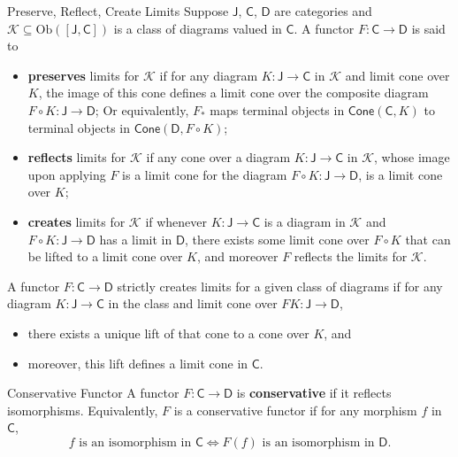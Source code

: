 \begin{definition}{Preserve, Reflect, Create Limits}{}
    Suppose $\mathsf{J}$, $\mathsf{C}$, $\mathsf{D}$ are categories and $\mathcal{K}\subseteq\mathrm{Ob}\left([\mathsf{J}, \mathsf{C}]\right)$ is a class of diagrams  valued in $\mathsf{C}$. A functor $F: \mathsf{C} \rightarrow \mathsf{D}$ is said to
    \begin{itemize}
        \item \textbf{preserves} limits for $\mathcal{K}$ if for any diagram $K: \mathsf{J} \rightarrow \mathsf{C}$ in $\mathcal{K}$ and limit cone over $K$, the image of this cone defines a limit cone over the composite diagram $F\circ K: \mathsf{J} \rightarrow \mathsf{D}$; Or equivalently, $F_*$ maps terminal objects in $\mathsf{Cone}(\mathsf{C},K)$ to terminal objects in $\mathsf{Cone}(\mathsf{D},F\circ K)$;
        \item \textbf{reflects} limits for $\mathcal{K}$ if any cone over a diagram $K: \mathsf{J} \rightarrow \mathsf{C}$ in $\mathcal{K}$, whose image upon applying $F$ is a limit cone for the diagram $F\circ K: \mathsf{J} \rightarrow \mathsf{D}$, is a limit cone over $K$;
        \item \textbf{creates} limits for $\mathcal{K}$ if whenever $K: \mathsf{J} \rightarrow \mathsf{C}$ is a diagram in $\mathcal{K}$ and $F\circ K: \mathsf{J} \rightarrow \mathsf{D}$ has a limit in $\mathsf{D}$, there exists some limit cone over $F\circ K$ that can be lifted to a limit cone over $K$, and moreover $F$ reflects the limits for $\mathcal{K}$.
    \end{itemize}
\end{definition}

\begin{definition}{}{}
    A functor $F: \mathsf{C} \rightarrow \mathsf{D}$ strictly creates limits for a given class of diagrams if for any diagram $K: \mathsf{J} \rightarrow \mathsf{C}$ in the class and limit cone over $F K: \mathsf{J} \rightarrow \mathsf{D}$,
    \begin{itemize}
        \item there exists a unique lift of that cone to a cone over $K$, and
        \item moreover, this lift defines a limit cone in $\mathsf{C}$.
    \end{itemize}

\end{definition}


\begin{definition}{Conservative Functor}{}
    A functor $F:\mathsf{C}\to\mathsf{D}$ is \textbf{conservative} if it reflects isomorphisms. Equivalently, $F$ is a conservative functor if for any morphism $f$ in $\mathsf{C}$, 
    \[
        \text{$f$ is an isomorphism in $\mathsf{C}$}\iff\text{$F(f)$ is an isomorphism in $\mathsf{D}$}. 
    \]
\end{definition}


